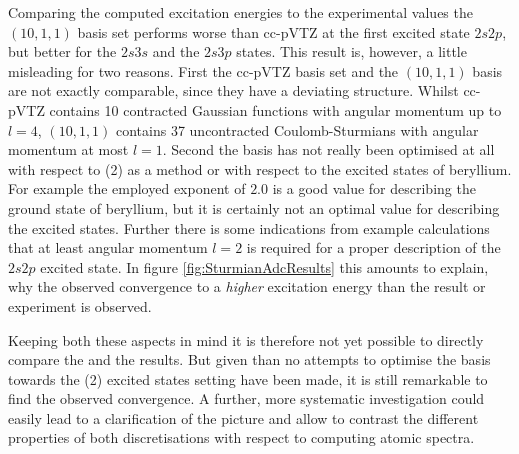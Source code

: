 Comparing the computed excitation energies to the experimental values
the $(10,1,1)$ basis set
performs worse than cc-pVTZ at the first excited state $2s2p$,
but better for the $2s3s$ and the $2s3p$ states.
This result is, however, a little misleading for two reasons.
First the cc-pVTZ basis set and the $(10,1,1)$ \CS basis are not exactly comparable,
since they have a deviating structure.
Whilst cc-pVTZ contains 10 contracted Gaussian
functions with angular momentum up to $l = 4$,
$(10,1,1)$ contains 37 uncontracted Coulomb-Sturmians
with angular momentum at most $l = 1$.
Second the \CS basis has not really been optimised at all
with respect to {\ADC}(2) as a method or with respect to the excited states of beryllium.
For example the employed \CS exponent of $2.0$ is a good value for describing
the ground state of beryllium, but it is certainly not an optimal value
for describing the excited states.
Further there is some indications from example calculations
that at least angular momentum $l = 2$
is required for a proper description of the $2s2p$ excited state.
In figure \ref{fig:SturmianAdcResults} this amounts to explain,
why the observed convergence to a \emph{higher} excitation energy
than the \cGTO result or experiment is observed.

Keeping both these aspects in mind it is therefore not yet possible
to directly compare the \CS and the \cGTO results.
But given than no attempts to optimise the \CS basis towards the {\ADC}(2)
excited states setting have been made,
it is still remarkable to find the observed convergence.
A further, more systematic investigation could easily lead
to a clarification of the picture and allow to contrast
the different properties of both discretisations with respect to computing atomic spectra.


%
